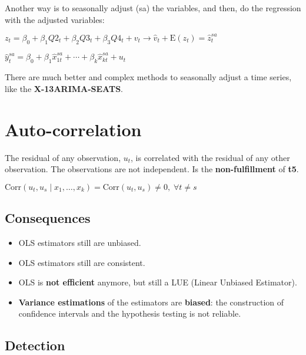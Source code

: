 \documentclass[10pt, a4paper, landscape]{extarticle}
\newcommand{\E}{\mathrm{E}}
\newcommand{\Corr}{\mathrm{Corr}}
\begin{document}
\begin{multicols}{3}
Another way is to seasonally adjust (sa) the variables, and then, do the regression with the adjusted variables:

\begin{center}
	$z_t = \beta_0 + \beta_1 Q2_t + \beta_2 Q3_t + \beta_3 Q4_t  + v_t \rightarrow \hat{v}_t + \E(z_t) = \hat{z}_t^{sa}$

	$\hat{y}_t^{sa} = \beta_0 + \beta_1 \hat{x}_{1t}^{sa} + \cdots + \beta_k \hat{x}_{kt}^{sa} + u_t$
\end{center}

There are much better and complex methods to seasonally adjust a time series, like the \textbf{X-13ARIMA-SEATS}.

\columnbreak

\section*{Auto-correlation}

The residual of any observation, $u_t$, is correlated with the residual of any other observation. The observations are not independent. Is the \textbf{non-fulfillment} of \textbf{t5}.

\begin{center}
	$\Corr(u_t, u_s \mid x_1, \ldots, x_k) = \Corr(u_t, u_s) \neq 0, \; \forall t \neq s$
\end{center}

\subsection*{Consequences}

\begin{itemize}[leftmargin=*]
	\item OLS estimators still are unbiased.
	\item OLS estimators still are consistent.
	\item OLS is \textbf{not efficient} anymore, but still a LUE (Linear Unbiased Estimator).
	\item \textbf{Variance estimations} of the estimators are \textbf{biased}: the construction of confidence intervals and the hypothesis testing is not reliable.
\end{itemize}

\subsection*{Detection}


\end{multicols}
\end{document}
